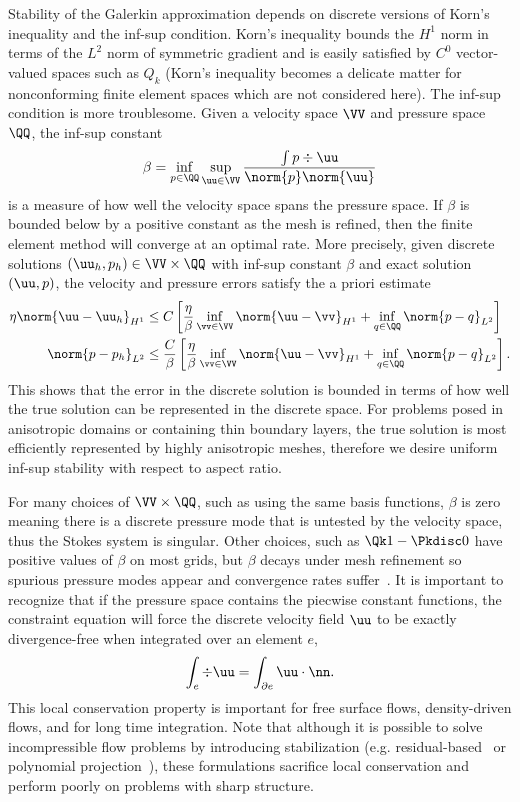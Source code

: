 Stability of the Galerkin approximation depends on discrete versions of Korn's inequality and the inf-sup condition.
Korn's inequality bounds the $H^1$ norm in terms of the $L^2$ norm of symmetric gradient and is easily satisfied by $C^0$ vector-valued spaces such as $Q_k$ (Korn's inequality becomes a delicate matter for nonconforming finite element spaces which are not considered here).
The inf-sup condition is more troublesome.
Given a velocity space $\VV$ and pressure space $\QQ$, the inf-sup constant
\begin{equation}\label{eq:slip:inf-sup}
  \beta = \inf_{p\in \QQ} \sup_{\uu\in\VV} \frac{\int p\div\uu}{\norm{p} \norm{\uu}}
\end{equation}
is a measure of how well the velocity space spans the pressure space.
If $\beta$ is bounded below by a positive constant as the mesh is refined, then the finite element method will converge at an optimal rate.
More precisely, given discrete solutions $(\uu_h,p_h) \in \VV \times \QQ$ with inf-sup constant $\beta$ and exact solution $(\uu,p)$, the velocity and pressure errors satisfy the a priori estimate~\cite{brezzi1991mixed}
\begin{align}\label{eq:slip:apriori}
  \eta \norm{\uu - \uu_h}_{H^1} & \le C \left[ \frac{\eta}{\beta} \inf_{\vv \in \VV} \norm{\uu - \vv}_{H^1} + \inf_{q \in \QQ} \norm{p-q}_{L^2} \right] \\
  \norm{p - p_h}_{L^2} & \le \frac{C}{\beta} \left[ \frac{\eta}{\beta} \inf_{\vv \in \VV} \norm{\uu - \vv}_{H^1} + \inf_{q\in\QQ} \norm{p-q}_{L^2} \right] .
\end{align}
This shows that the error in the discrete solution is bounded in terms of how well the true solution can be represented in the discrete space.
For problems posed in anisotropic domains or containing thin boundary layers, the true solution is most efficiently represented by highly anisotropic meshes, therefore we desire uniform inf-sup stability with respect to aspect ratio.

For many choices of $\VV \times \QQ$, such as using the same basis functions, $\beta$ is zero meaning there is a discrete pressure mode that is untested by the velocity space, thus the Stokes system is singular.
Other choices, such as $\Qk 1-\Pkdisc 0$ have positive values of $\beta$ on most grids, but $\beta$ decays under mesh refinement so spurious pressure modes appear and convergence rates suffer~\cite{brenner2008mathematical,chapelle1993inf,babuska1997babuska}.
It is important to recognize that if the pressure space contains the piecwise constant functions, the constraint equation will force the discrete velocity field $\uu$ to be exactly divergence-free when integrated over an element $e$,
\begin{gather*}
  \int_e \div\uu = \int_{\partial e} \uu\cdot\nn.
\end{gather*}
This local conservation property is important for free surface flows, density-driven flows, and for long time integration.
Note that although it is possible to solve incompressible flow problems by introducing stabilization (e.g. residual-based~\cite{hughes1986new} or polynomial projection~\cite{dohrmann2004stabilized}), these formulations sacrifice local conservation and perform poorly on problems with sharp structure.

